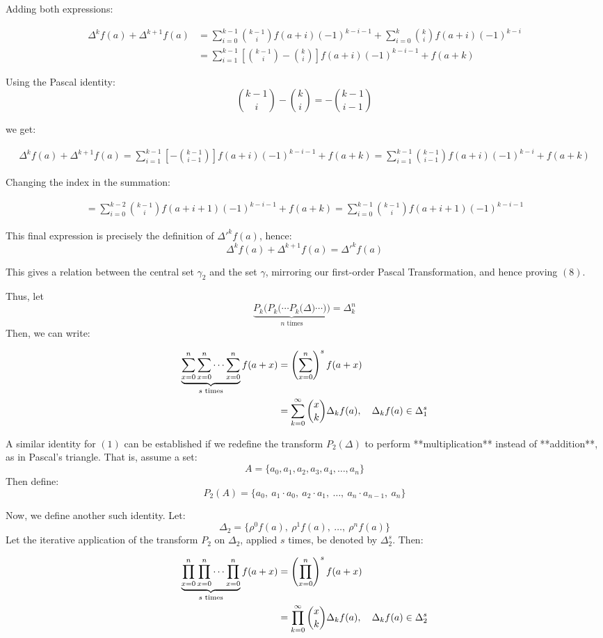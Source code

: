 Adding both expressions:

\begin{align}
\Delta^k f(a) + \Delta^{k+1} f(a) 
&= \sum_{i=0}^{k-1} \binom{k-1}{i} f(a+i)(-1)^{k-i-1}
+ \sum_{i=0}^{k} \binom{k}{i} f(a+i)(-1)^{k-i} \\
&= \sum_{i=1}^{k-1} \left[\binom{k-1}{i} - \binom{k}{i} \right] f(a+i)(-1)^{k-i-1}
+ f(a+k)
\end{align}

Using the Pascal identity:
\[
\binom{k-1}{i} - \binom{k}{i} = -\binom{k-1}{i-1}
\]

we get:

\begin{align}
\Delta^k f(a) + \Delta^{k+1} f(a) 
= \sum_{i=1}^{k-1} \left[ -\binom{k-1}{i-1} \right] f(a+i)(-1)^{k-i-1} + f(a+k)
= \sum_{i=1}^{k-1} \binom{k-1}{i-1} f(a+i)(-1)^{k-i} + f(a+k)
\end{align}

Changing the index in the summation:

\begin{align}
= \sum_{i=0}^{k-2} \binom{k-1}{i} f(a+i+1)(-1)^{k-i-1} + f(a+k)
= \sum_{i=0}^{k-1} \binom{k-1}{i} f(a+i+1)(-1)^{k-i-1}
\end{align}

This final expression is precisely the definition of $\Delta'^k f(a)$, hence:
\[
\Delta^k f(a) + \Delta^{k+1} f(a) = \Delta'^k f(a)
\]

This gives a relation between the central set $\gamma_2$ and the set $\gamma$, mirroring our first-order Pascal Transformation, and hence proving $(8)$.

Thus, let
\[
\underbrace{
P_k\big(
P_k\big(
\cdots
P_k\big(
\Delta
\big)
\cdots
\big)
\big)
}_{n \text{ times}}
= \Delta_k^n
\]
Then, we can write:

\begin{align}
\underbrace{
\sum_{x=0}^{n}
\sum_{x=0}^{n}
\cdots
\sum_{x=0}^{n}
}_{s \text{ times}}
f(a + x)
&= \left( \sum_{x=0}^{n} \right)^s f(a + x) \notag \\
&= \sum_{k=0}^{\infty} \binom{x}{k} \Delta_k f(a),
\quad \Delta_k f(a) \in \Delta_1^s
\end{align}

A similar identity for $(1)$ can be established if we redefine the transform $P_2(\Delta)$ to perform **multiplication** instead of **addition**, as in Pascal's triangle. That is, assume a set:
\[
A = \{ a_0, a_1, a_2, a_3, a_4, \dots, a_n \}
\]
Then define:
\[
P_2(A) = \{ a_0,\ a_1 \cdot a_0,\ a_2 \cdot a_1,\ \dots,\ a_n \cdot a_{n-1},\ a_n \}
\]

Now, we define another such identity. Let:
\[
\Delta_2 = \{ \rho^0 f(a),\ \rho^1 f(a),\ \dots,\ \rho^n f(a) \}
\]
Let the iterative application of the transform $P_2$ on $\Delta_2$, applied $s$ times, be denoted by $\Delta_2^s$. Then:

\begin{align}
\underbrace{
\prod_{x=0}^{n}
\prod_{x=0}^{n}
\cdots
\prod_{x=0}^{n}
}_{s \text{ times}}
f(a + x)
&= \left( \prod_{x=0}^{n} \right)^s f(a + x) \notag \\
&= \prod_{k=0}^{\infty} \binom{x}{k} \Delta_k f(a),
\quad \Delta_k f(a) \in \Delta_2^s
\end{align}
